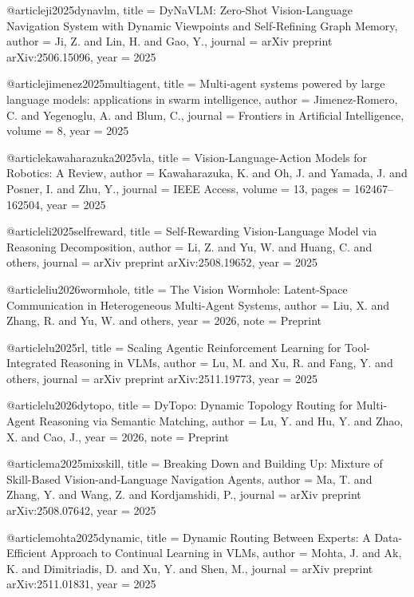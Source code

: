 @article{ji2025dynavlm,
  title   = {{DyNaVLM}: Zero-Shot Vision-Language Navigation System with Dynamic Viewpoints and Self-Refining Graph Memory},
  author  = {Ji, Z. and Lin, H. and Gao, Y.},
  journal = {arXiv preprint arXiv:2506.15096},
  year    = {2025}
}

@article{jimenez2025multiagent,
  title   = {Multi-agent systems powered by large language models: applications in swarm intelligence},
  author  = {Jimenez-Romero, C. and Yegenoglu, A. and Blum, C.},
  journal = {Frontiers in Artificial Intelligence},
  volume  = {8},
  year    = {2025}
}

@article{kawaharazuka2025vla,
  title   = {Vision-Language-Action Models for Robotics: A Review},
  author  = {Kawaharazuka, K. and Oh, J. and Yamada, J. and Posner, I. and Zhu, Y.},
  journal = {IEEE Access},
  volume  = {13},
  pages   = {162467--162504},
  year    = {2025}
}

@article{li2025selfreward,
  title   = {Self-Rewarding Vision-Language Model via Reasoning Decomposition},
  author  = {Li, Z. and Yu, W. and Huang, C. and others},
  journal = {arXiv preprint arXiv:2508.19652},
  year    = {2025}
}

@article{liu2026wormhole,
  title   = {The Vision Wormhole: Latent-Space Communication in Heterogeneous Multi-Agent Systems},
  author  = {Liu, X. and Zhang, R. and Yu, W. and others},
  year    = {2026},
  note    = {Preprint}
}

@article{lu2025rl,
  title   = {Scaling Agentic Reinforcement Learning for Tool-Integrated Reasoning in {VLMs}},
  author  = {Lu, M. and Xu, R. and Fang, Y. and others},
  journal = {arXiv preprint arXiv:2511.19773},
  year    = {2025}
}

@article{lu2026dytopo,
  title   = {{DyTopo}: Dynamic Topology Routing for Multi-Agent Reasoning via Semantic Matching},
  author  = {Lu, Y. and Hu, Y. and Zhao, X. and Cao, J.},
  year    = {2026},
  note    = {Preprint}
}

@article{ma2025mixskill,
  title   = {Breaking Down and Building Up: Mixture of Skill-Based Vision-and-Language Navigation Agents},
  author  = {Ma, T. and Zhang, Y. and Wang, Z. and Kordjamshidi, P.},
  journal = {arXiv preprint arXiv:2508.07642},
  year    = {2025}
}

@article{mohta2025dynamic,
  title   = {Dynamic Routing Between Experts: A Data-Efficient Approach to Continual Learning in {VLMs}},
  author  = {Mohta, J. and Ak, K. and Dimitriadis, D. and Xu, Y. and Shen, M.},
  journal = {arXiv preprint arXiv:2511.01831},
  year    = {2025}
}


